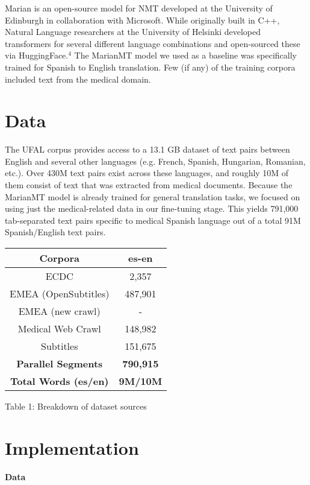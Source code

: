 \documentclass{article}
\begin{document}
\begin{multicols}{2}
Marian is an open-source model for NMT  developed at the University of Edinburgh in collaboration with Microsoft. While originally built in C++, Natural Language researchers at the University of Helsinki developed transformers for several different language combinations and open-sourced these via HuggingFace.$^{4}$ The MarianMT model we used as a baseline was specifically trained for Spanish to English translation. Few (if any) of the training corpora included text from the medical domain. 
\section{Data}
The UFAL corpus provides access to a 13.1 GB dataset of text pairs between English and several other languages (e.g. French, Spanish, Hungarian,  Romanian, etc.). Over 430M text pairs exist across these languages, and roughly 10M of them consist of text that was extracted from medical documents. Because the MarianMT model is already trained for general translation tasks, we focused on using just the medical-related data in our fine-tuning stage. This yields 791,000 tab-separated text pairs specific to medical Spanish language out of a total 91M Spanish/English text pairs.\\

\begingroup
\centering
\begin{tabular}{|c|c|}
\hline
Corpora & es-en \\
\hline
\small{ECDC} & \small{2,357} \\
\small{EMEA (OpenSubtitles)} & \small{487,901} \\
\small{EMEA (new crawl)}    & \small{ - }\\
\small{Medical Web Crawl}   & \small{148,982} \\
\small{Subtitles} & \small{151,675} \\
\small{\textbf{Parallel Segments}} & \small{\textbf{790,915}}\\
\small{\textbf{Total Words (es/en)}} & \small{\textbf{9M/10M}} \\
\hline
\end{tabular}
\caption{\small{Table 1: Breakdown of dataset sources}}
\label{table:ta}
\endgroup

\columnbreak

\section{Implementation}
\textbf{Data}


\end{multicols}
\end{document}

